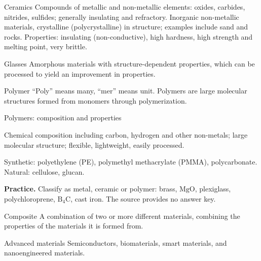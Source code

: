 \documentclass[11pt]{article}
\begin{document}
\begin{keydef}{Ceramics}
Compounds of metallic and non-metallic elements: oxides, carbides, nitrides,
sulfides; generally insulating and refractory.  Inorganic
non-metallic materials, crystalline (polycrystalline) in structure; examples
include sand and rocks. Properties: insulating (non-conductive), high hardness,
high strength and melting point, very brittle. 
\end{keydef}

\begin{keydef}{Glasses}
Amorphous materials with structure-dependent properties, which can be processed
to yield an improvement in properties. 
\end{keydef}


\begin{keydef}{Polymer}
``Poly'' means many, ``mer'' means unit. Polymers are large molecular structures
formed from monomers through polymerization. 
\end{keydef}

\begin{keydef}{Polymers: composition and properties}
\begin{points}
\item Chemical composition including carbon, hydrogen and other non-metals;
large molecular structure; flexible, lightweight, easily processed. 
\item Synthetic: polyethylene (PE), polymethyl methacrylate (PMMA),
polycarbonate. Natural: cellulose, glucan. 
\end{points}
\end{keydef}

\begin{points}
\item \textbf{Practice.} Classify as metal, ceramic or polymer: brass,
$\mathrm{MgO}$, plexiglass, polychloroprene, $\mathrm{B_4C}$, cast iron. The
source provides no answer key. 
\end{points}


\begin{keydef}{Composite}
A combination of two or more different materials, combining the properties of
the materials it is formed from. 
\end{keydef}

\begin{keydef}{Advanced materials}
Semiconductors, biomaterials, smart materials, and nanoengineered materials.
\end{keydef}
\end{document}
